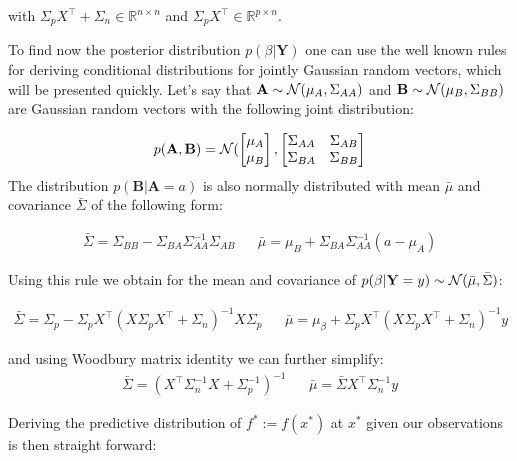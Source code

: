 with $\Sigma_p X^{\top} + \Sigma_n \in \mathbb{R}^{n\times n}$ and $\Sigma_p X^{\top} \in \mathbb{R}^{p\times n}$.

To find now the posterior distribution $p(\beta |  \mathbf{Y})$ one can use the well known rules for deriving conditional
distributions for jointly Gaussian random vectors, which will be presented quickly.
Let's say that $\mathbf{A} \sim \operatorname{\mathcal{N}}(\mu_A, \Sigma_{AA})$ and $\mathbf{B} \sim \operatorname{\mathcal{N}}(\mu_B, \Sigma_{BB})$ are
Gaussian random vectors with the following joint distribution:

\begin{gather}
    p(\mathbf{A}, \mathbf{B}) = \operatorname{\mathcal{N}}(
    \begin{bmatrix}
        \mu_A \\
        \mu_B
    \end{bmatrix},
    \begin{bmatrix}
        \Sigma_{AA} & \Sigma_{AB} \\
        \Sigma_{BA} & \Sigma_{BB}
    \end{bmatrix}
\end{gather}
The distribution $p(\mathbf{B} | \mathbf{A}=a)$ is also normally distributed with mean $\bar{\mu}$ and covariance
$\bar{\Sigma}$ of the following form:

\begin{align}\label{def:conditioning}
    \bar{\Sigma} = \Sigma_{B B} - \Sigma_{B A} \Sigma_{A A}^{-1} \Sigma_{A B} & & \bar{\mu} = \mu_{B} + \Sigma_{BA} \Sigma_{AA}^{-1}(a - \mu_A)
\end{align}


Using this rule we obtain for the mean and covariance of $p(\beta | \mathbf{Y}=y) \sim \operatorname{\mathcal{N}}(\bar{\mu}, \bar{\Sigma})$:

\begin{align*}
    \bar{\Sigma} = \Sigma_{p} - \Sigma_p X^{\top}(X \Sigma_p X^{\top} + \Sigma_n)^{-1} X  \Sigma_p & & \bar{\mu} = \mu_{\beta} + \Sigma_p X^{\top}(X \Sigma_p X^{\top} + \Sigma_n)^{-1}y
\end{align*}

and using Woodbury matrix identity we can further simplify:
\begin{align*}
    \bar{\Sigma} = (X^{\top}\Sigma_n^{-1}X + \Sigma_p^{-1})^{-1} & & \bar{\mu} = \bar{\Sigma} X^{\top} \Sigma_n^{-1} y
\end{align*}

Deriving the predictive distribution of $f^{\ast} := f(x^{\ast})$ at $x^{\ast}$ given our
observations is then straight forward:


